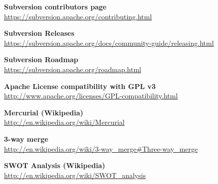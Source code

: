 \documentclass[a4paper,10pt]{article}
\begin{document}
\begin{thebibliography}{25}
\textbf{Subversion contributors page}\\
{\footnotesize\url{https://subversion.apache.org/contributing.html}}

\textbf{Subversion Releases}\\
{\footnotesize\url{
https://subversion.apache.org/docs/community-guide/releasing.html}}

\textbf{Subversion Roadmap}\\
{\footnotesize\url{https://subversion.apache.org/roadmap.html}}

\textbf{Apache License compatibility with GPL v3}\\
{\footnotesize\url{http://www.apache.org/licenses/GPL-compatibility.html}}

\textbf{Mercurial (Wikipedia)}\\
{\footnotesize\url{http://en.wikipedia.org/wiki/Mercurial}}

\textbf{3-way merge}\\
{\footnotesize\url{http://en.wikipedia.org/wiki/3-way_merge#Three-way_merge}}

\textbf{SWOT Analysis (Wikipedia)}\\
{\footnotesize\url{http://en.wikipedia.org/wiki/SWOT_analysis}}


\end{thebibliography}
\end{document}
